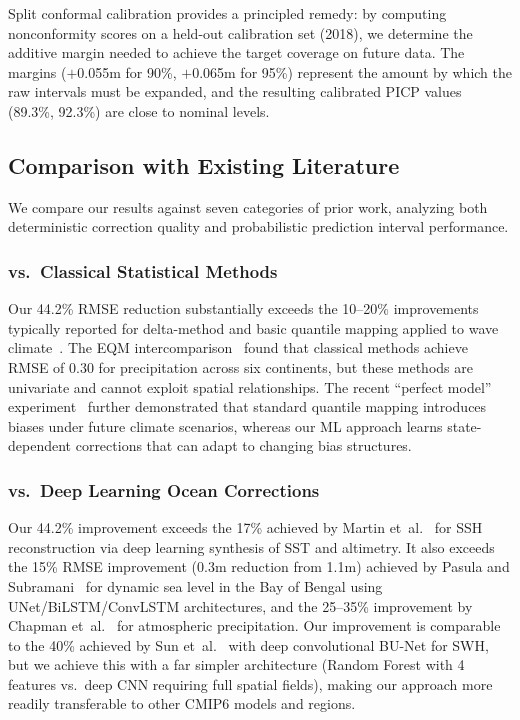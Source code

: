 \documentclass[conference]{IEEEtran}
\begin{document}
Split conformal calibration provides a principled remedy: by computing nonconformity scores on a held-out calibration set (2018), we determine the additive margin needed to achieve the target coverage on future data. The margins ($+$0.055m for 90\%, $+$0.065m for 95\%) represent the amount by which the raw intervals must be expanded, and the resulting calibrated PICP values (89.3\%, 92.3\%) are close to nominal levels.

\subsection{Comparison with Existing Literature}

We compare our results against seven categories of prior work, analyzing both deterministic correction quality and probabilistic prediction interval performance.

\subsubsection{vs.\ Classical Statistical Methods}

Our 44.2\% RMSE reduction substantially exceeds the 10--20\% improvements typically reported for delta-method and basic quantile mapping applied to wave climate~\cite{lemos2020}. The EQM intercomparison~\cite{intercomp2025} found that classical methods achieve RMSE of 0.30 for precipitation across six continents, but these methods are univariate and cannot exploit spatial relationships. The recent ``perfect model'' experiment~\cite{qm_future2025} further demonstrated that standard quantile mapping introduces biases under future climate scenarios, whereas our ML approach learns state-dependent corrections that can adapt to changing bias structures.

\subsubsection{vs.\ Deep Learning Ocean Corrections}

Our 44.2\% improvement exceeds the 17\% achieved by Martin et~al.~\cite{martin2023} for SSH reconstruction via deep learning synthesis of SST and altimetry. It also exceeds the 15\% RMSE improvement (0.3m reduction from 1.1m) achieved by Pasula and Subramani~\cite{pasula2025} for dynamic sea level in the Bay of Bengal using UNet/BiLSTM/ConvLSTM architectures, and the 25--35\% improvement by Chapman et~al.~\cite{chapman2025} for atmospheric precipitation. Our improvement is comparable to the 40\% achieved by Sun et~al.~\cite{sun2022} with deep convolutional BU-Net for SWH, but we achieve this with a far simpler architecture (Random Forest with 4 features vs.\ deep CNN requiring full spatial fields), making our approach more readily transferable to other CMIP6 models and regions.
\end{document}
